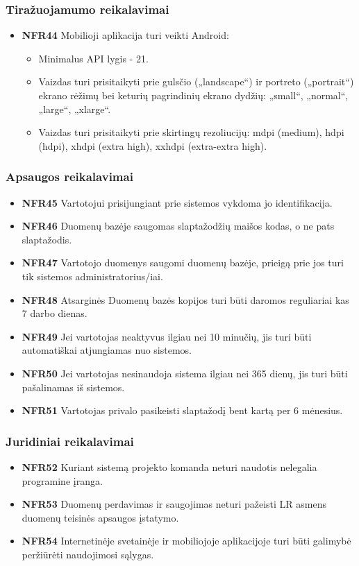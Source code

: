 \documentclass{VUMIFPSbakalaurinis}
\begin{document}
\subsubsection{Tiražuojamumo reikalavimai}
\begin{itemize}
	\item \textbf{NFR44} Mobilioji aplikacija turi veikti Android:
	\begin{itemize}
		\item Minimalus API lygis - 21.
		\item Vaizdas turi prisitaikyti prie gulsčio („landscape“) ir portreto („portrait“) ekrano rėžimų bei keturių pagrindinių ekrano dydžių: „small“, „normal“, „large“, „xlarge“.
		\item Vaizdas turi prisitaikyti prie skirtingų rezoliucijų: mdpi (medium), hdpi (hdpi), xhdpi (extra high), xxhdpi (extra-extra high).
	\end{itemize}
\end{itemize}

\subsubsection{Apsaugos reikalavimai}
\begin{itemize}
	\item \textbf{NFR45} Vartotojui prisijungiant prie sistemos vykdoma jo identifikacija.
	\item \textbf{NFR46} Duomenų bazėje saugomas slaptažodžių maišos kodas, o ne pats slaptažodis.
	\item \textbf{NFR47} Vartotojo duomenys saugomi duomenų bazėje, prieigą prie jos turi tik sistemos administratorius/iai.
	\item \textbf{NFR48} Atsarginės Duomenų bazės kopijos turi būti daromos reguliariai kas 7 darbo dienas.
	\item \textbf{NFR49} Jei vartotojas neaktyvus ilgiau nei 10 minučių, jis turi būti automatiškai atjungiamas nuo sistemos.
	\item \textbf{NFR50} Jei vartotojas nesinaudoja sistema ilgiau nei 365 dienų, jis turi būti pašalinamas iš sistemos.
	\item \textbf{NFR51} Vartotojas privalo pasikeisti slaptažodį bent kartą per 6 mėnesius.
\end{itemize}

\subsubsection{Juridiniai reikalavimai}
\begin{itemize}
	\item \textbf{NFR52} Kuriant sistemą projekto komanda neturi naudotis nelegalia programine įranga.
	\item \textbf{NFR53} Duomenų perdavimas ir saugojimas neturi pažeisti LR asmens duomenų teisinės apsaugos įstatymo.
	\item \textbf{NFR54} Internetinėje svetainėje ir mobiliojoje aplikacijoje turi būti galimybė peržiūrėti naudojimosi sąlygas.
\end{itemize}
\end{document}
